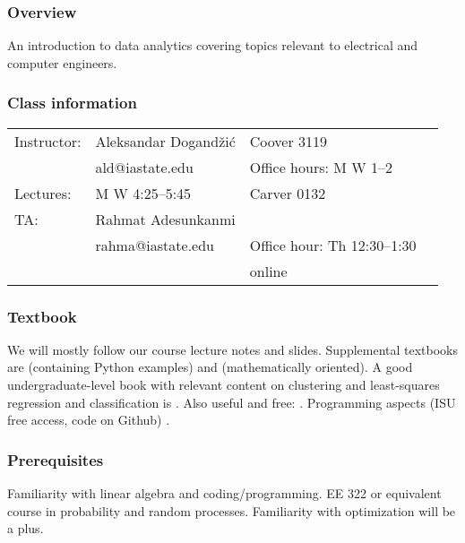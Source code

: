 \documentclass[11pt,twoside]{article}
\begin{document}

\subsubsection*{Overview}
An introduction to data analytics covering topics relevant to electrical and 
computer
engineers.



\subsubsection*{Class information}

\begin{tabular}{llll}
Instructor:

& Aleksandar Dogand\v{z}i\'c & Coover 3119
        & \\
        & ald@iastate.edu & Office hours: M W 1--2 \\
        Lectures:
        & M W 4:25--5:45 &  Carver 0132 & \medskip \\

TA:

& Rahmat Adesunkanmi & \\
& rahma@iastate.edu &
Office hour: Th 12:30--1:30
\\
&
& online


      \end{tabular}

\subsubsection*{Textbook}
We will mostly follow our course lecture notes and slides. Supplemental 
textbooks are \cite{Murphy21} (containing Python examples)
and
\cite{BlumHopcroftKannan2020}
(mathematically oriented). A good undergraduate-level book with relevant 
content on clustering and least-squares regression and classification is 
\cite{BoydVandenberghe2018}.  Also useful and free: 
\cite{HastieTibshiraniFriedman2009,Leskovec2019mining}.
Programming aspects (ISU free access, code on Github)
\cite{RaschkaMirjalili2022,MuellerGuido2016}. 

\subsubsection*{Prerequisites}
 Familiarity
with linear algebra and coding/programming. EE 322 or equivalent course in 
probability and random processes.
Familiarity with optimization will
be a plus. 
\end{document}
